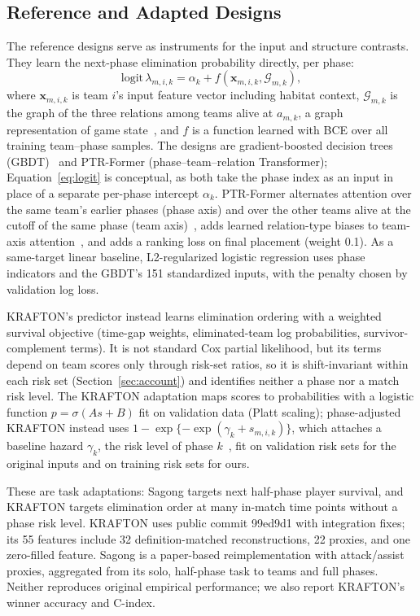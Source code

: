 \documentclass[sigconf,anonymous]{acmart}
\begin{document}
\subsection{Reference and Adapted Designs}
\label{sec:method:rq2}
The reference designs serve as instruments for the input and structure contrasts. They learn the next-phase elimination probability directly, per phase:
\begin{equation}
\mathrm{logit}\,\lambda_{m,i,k}=\alpha_k+f(\mathbf{x}_{m,i,k},\mathcal{G}_{m,k}),
\label{eq:logit}
\end{equation}
where $\mathbf{x}_{m,i,k}$ is team $i$'s input feature vector including habitat context, $\mathcal{G}_{m,k}$ is the graph of the three relations among teams alive at $a_{m,k}$, a graph representation of game state~\cite{Xenopoulos21}, and $f$ is a function learned with BCE over all training team--phase samples. The designs are gradient-boosted decision trees (GBDT)~\cite{Friedman01} and PTR-Former (phase--team--relation Transformer); Equation~\eqref{eq:logit} is conceptual, as both take the phase index as an input in place of a separate per-phase intercept $\alpha_k$. PTR-Former alternates attention over the same team's earlier phases (phase axis) and over the other teams alive at the cutoff of the same phase (team axis)~\cite{Vaswani17,Ngiam22}, adds learned relation-type biases to team-axis attention~\cite{Ying21}, and adds a ranking loss on final placement (weight 0.1). As a same-target linear baseline, L2-regularized logistic regression uses phase indicators and the GBDT's 151 standardized inputs, with the penalty chosen by validation log loss.

KRAFTON's predictor instead learns elimination ordering with a weighted survival objective (time-gap weights, eliminated-team log probabilities, survivor-complement terms). It is not standard Cox partial likelihood, but its terms depend on team scores only through risk-set ratios, so it is shift-invariant within each risk set (Section~\ref{sec:account}) and identifies neither a phase nor a match risk level. The KRAFTON adaptation maps scores to probabilities with a logistic function $p=\sigma(A s+B)$ fit on validation data (Platt scaling); phase-adjusted KRAFTON instead uses $1-\exp\{-\exp(\gamma_k+s_{m,i,k})\}$, which attaches a baseline hazard $\gamma_k$, the risk level of phase $k$~\cite{PrenticeGloeckler78}, fit on validation risk sets for the original inputs and on training risk sets for ours.

These are task adaptations: Sagong targets next half-phase player survival, and KRAFTON targets elimination order at many in-match time points without a phase risk level. KRAFTON uses public commit 99ed9d1 with integration fixes; its 55 features include 32 definition-matched reconstructions, 22 proxies, and one zero-filled feature. Sagong is a paper-based reimplementation with attack/assist proxies, aggregated from its solo, half-phase task to teams and full phases. Neither reproduces original empirical performance; we also report KRAFTON's winner accuracy and C-index.
\end{document}
